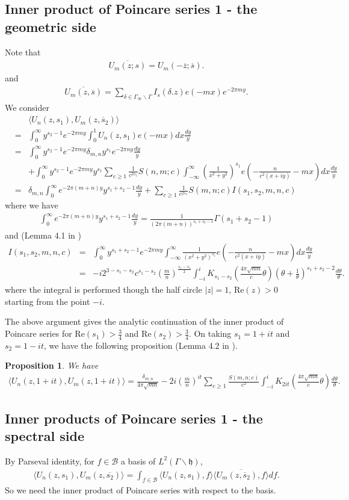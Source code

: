 \documentclass[11pt,reqno]{amsart}
\newcommand{\bna}{\begin{eqnarray*}}
\newcommand{\ena}{\end{eqnarray*}}
\newcommand{\mk}{\mathfrak}
\def\re{{\mathrm{Re}}}
\newtheorem{prop}[lemma]{Proposition}
\theoremstyle{definition}
\begin{document}
\subsection{Inner product of Poincare series 1 - the geometric side}
Note that
\bna
\overline{U_m(z;s)}= U_m(-\overline{z};\overline s).
\ena
and
\bna
\overline{U_m(z,\overline s)}=\sum_{\delta\in\Gamma_\infty\backslash\Gamma}
I_s(\delta.z) e(-mx)e^{-2\pi m y}.
\ena
We consider
\bna
&&\langle
U_n(z,s_1),
U_m(z,\overline s_2)
\rangle \\
&=&\int_0^\infty y^{s_2-1}e^{-2\pi m y}\int_0^1 U_n(z,s_1)e(-mx)dx\frac{dy}{y}\\
&=&
\int_0^\infty y^{s_2-1}e^{-2\pi m y}
\delta_{m,n}y^{s_1}e^{-2\pi ny}\frac{dy}{y}\\
&&
+
\int_0^\infty y^{s_2-1}e^{-2\pi my}
y^{s_1}\sum_{c\geq 1}\frac{1}{c^{2s_1}}
S(n,m;c)
\int_{-\infty}^\infty\left(\frac{1}{x^2+y^2}\right)^{s_1} e\left(-\frac{n}{c^2(x+iy)}-mx\right)dx\frac{dy}{y}\\
&=&\delta_{m,n}\int_{0}^\infty e^{-2\pi(m+n)y}y^{s_1+s_2-1}\frac{dy}{y}
+\sum_{c\geq 1}\frac{1}{c^{2s_1}}S(m,n;c)
I(s_1,s_2,m,n,c)
\ena
where we have
\bna
\int_{0}^\infty e^{-2\pi(m+n)y}y^{s_1+s_2-1}\frac{dy}{y}
=\frac{1}{(2\pi(m+n))^{s_1+s_2-1}}\Gamma(s_1+s_2-1)
\ena
and (Lemma 4.1 in \cite{DeIw1982})
\bna
I(s_1,s_2,m,n,c)
&=&\int_0^\infty  y^{s_1+s_2-1}e^{-2\pi m y}
\int_{-\infty}^\infty \frac{1}{(x^2+y^2)^{s_1}}
e\left(-\frac{n}{c^2(x+iy)}-mx\right)dx\frac{dy}{y}\\
&=&-i2^{3-s_1-s_2}c^{s_1-s_2}
\left(\frac{m}{n}\right)^{\frac{s_1-s_1}{2}}
\int_{-i}^iK_{s_1-s_2}\left(\frac{4\pi\sqrt{ mn}}{c}\theta\right)
\left(\theta+\frac{1}{\theta}\right)^{s_1+s_2-2}\frac{d\theta}{\theta}.
\ena
where the integral is performed though the half circle $|z|=1$, $\re(z)>0$ starting
from the point $-i$.

The above argument gives the analytic continuation of the inner product of Poincare series for $\re(s_1)>\frac{3}{4}$ and $\re(s_2)>\frac{3}{4}$.
On taking $s_1=1+it$ and $s_2=1-it$,
we have the following proposition (Lemma 4.2 in \cite{DeIw1982}).
\begin{prop}\label{prop-tr1-geometr}
We have
\bna
\langle U_{n}(z,1+it),U_{m}(z,1+it)\rangle
=\frac{\delta_{m,n}}{4\pi\sqrt{mn}}
-2i\left(\frac{m}{n}\right)^{it}\sum_{c\geq 1}\frac{S(m,n;c)}{c^2}
\int_{-i}^iK_{2it}\left(\frac{4\pi\sqrt{mn}}{c}\theta\right)\frac{d\theta}{\theta}.
\ena
\end{prop}
\subsection{Inner products of Poincare series 1 - the spectral side}
By Parseval identity, for $f\in\mathcal B$ a basis of $L^2(\Gamma\backslash\mk h)$,
\bna
\langle U_n(z,s_1),U_m(z,\overline{s_2})\rangle
=\int_{f\in\mathcal B}\langle U_n(z,s_1),f\rangle
\overline{\langle U_m(z,\overline s_2),f\rangle} df.
\ena
So we need the inner product of Poincare series with respect to the basis.
\end{document}
